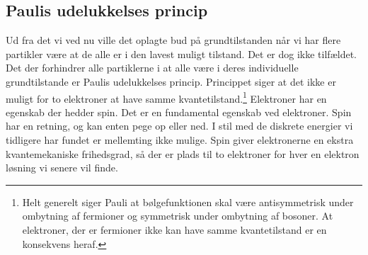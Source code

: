 \documentclass[../main.tex]{subfiles}
\begin{document}
\subsection{Paulis udelukkelses princip}
Ud fra det vi ved nu ville det oplagte bud på grundtilstanden når vi har flere partikler være at de alle er i den lavest muligt tilstand. Det er dog ikke tilfældet.
Det der forhindrer alle partiklerne i at alle være i deres individuelle grundtilstande er Paulis udelukkelses princip.
Princippet siger at det ikke er muligt for to elektroner at have samme kvantetilstand.\footnote{Helt generelt siger Pauli at bølgefunktionen skal være antisymmetrisk under ombytning af fermioner og symmetrisk under ombytning af bosoner. At elektroner, der er fermioner ikke kan have samme kvantetilstand er en konsekvens heraf.}
Elektroner har en egenskab der hedder spin. Det er en fundamental egenskab ved elektroner. Spin har en retning, og kan enten pege op eller ned. I stil med de diskrete energier vi tidligere har fundet er mellemting ikke mulige.
Spin giver elektronerne en ekstra kvantemekaniske frihedsgrad, så der er plads til to elektroner for hver en elektron løsning vi senere vil finde.
\end{document}
